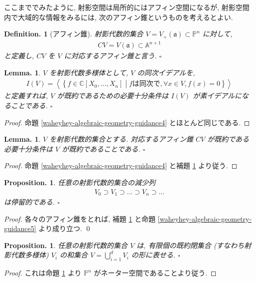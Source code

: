 \documentclass[openany, a4paper, oneside]{jsbook}
\theoremstyle{break}
\theoremstyle{breakdefn}
\newtheorem{lem}[thm]{Lemma.}
\newtheorem{prop}[thm]{Proposition.}
\newtheorem{defn}[thm]{Definition.}
\newcommand{\dbk}[1]{\left\langle #1 \right\rangle}
\newcommand{\relmiddle}[1]{\mathrel{}\middle#1\mathrel{}}
\newcommand{\set}[2]{\left\{#1 \relmiddle| #2\right\}}
\newcommand{\fin}{\hfill $\square$ \par}
\begin{document}
ここまででみたように, 射影空間は局所的にはアフィン空間になるが,
射影空間内で大域的な情報をみるには, 次のアフィン錐というものを考えるとよい.
\begin{defn}[アフィン錐]
射影代数的集合 $ V = V_+ ( \mathfrak{a} ) \subset \mathbb{P}^n $ に対して,
\begin{align}
 CV
 =
 V ( \mathfrak{a} )
 \subset
 \mathbb{A}^{n+1}
\end{align}
と定義し, $CV$ を $V$ に対応するアフィン錐と言う. \fin
\end{defn}
\begin{lem}\label{waheyhey-algebraic-geometry-guidance8}
$V$ を射影代数多様体として, $V$ の同次イデアルを,
\begin{align}
 I (V)
 =
 \dbk{\set{f \in \mathbb{C} [X_0, \dots , X_n]}{f \text{は同次で}, \forall x \in V , f (x)=0}}
\end{align}
と定義すれば, $V$ が既約であるための必要十分条件は $I (V)$ が素イデアルになることである. \fin
\end{lem}
\begin{proof}
命題 \ref{waheyhey-algebraic-geometry-guidance4} とほとんど同じである.
\end{proof}

\begin{lem}
 $V$ を射影代数的集合とする.
 対応するアフィン錐 $CV$ が既約である必要十分条件は $V$ が既約であることである. \fin
\label{lem1} \end{lem}
\begin{proof}
命題 \ref{waheyhey-algebraic-geometry-guidance4} と補題 \ref{waheyhey-algebraic-geometry-guidance8} より従う.
\end{proof}

\begin{prop}\label{waheyhey-algebraic-geometry-guidance9}
任意の射影代数的集合の減少列
\begin{align}
 V_0 \supset V_1 \supset \dots \supset V_n \supset \dots
\end{align}
は停留的である. \fin
\end{prop}
\begin{proof}
各々のアフィン錐をとれば, 補題 \ref{lem1} と命題 \ref{waheyhey-algebraic-geometry-guidance5} より成り立つ. \qed
\end{proof}

\begin{prop}\label{waheyhey-algebraic-geometry-guidance10}
任意の射影代数的集合 $V$ は, 有限個の既約閉集合 (すなわち射影代数多様体)
$V_i$ の和集合 $V = \bigcup_{ i = 1}^d V_i$ の形に表せる. \fin
\end{prop}
\begin{proof}
これは命題 \ref{waheyhey-algebraic-geometry-guidance9} より $\mathbb{P}^n$ がネーター空間であることより従う.
\end{proof}
\end{document}
